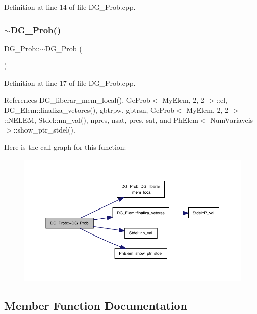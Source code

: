 Definition at line 14 of file D\+G\+\_\+\+Prob.\+cpp.

\mbox{\label{classDG__Prob_ac7d67077fa8154c22a52d63a24db7fba}} 
\subsubsection{\texorpdfstring{$\sim$\+D\+G\+\_\+\+Prob()}{~DG\_Prob()}}
{\footnotesize\ttfamily D\+G\+\_\+\+Prob\+::$\sim$\+D\+G\+\_\+\+Prob (\begin{DoxyParamCaption}{ }\end{DoxyParamCaption})}



Definition at line 17 of file D\+G\+\_\+\+Prob.\+cpp.



References D\+G\+\_\+liberar\+\_\+mem\+\_\+local(), Ge\+Prob$<$ My\+Elem, 2, 2 $>$\+::el, D\+G\+\_\+\+Elem\+::finaliza\+\_\+vetores(), gbtrpw, gbtrsn, Ge\+Prob$<$ My\+Elem, 2, 2 $>$\+::\+N\+E\+L\+EM, Stdel\+::nn\+\_\+val(), npres, nsat, pres, sat, and Ph\+Elem$<$ Num\+Variaveis $>$\+::show\+\_\+ptr\+\_\+stdel().

Here is the call graph for this function\+:
\nopagebreak
\begin{figure}[H]
\begin{center}
\leavevmode
\includegraphics[width=350pt]{classDG__Prob_ac7d67077fa8154c22a52d63a24db7fba_cgraph}
\end{center}
\end{figure}


\subsection{Member Function Documentation}
\mbox{\label{classGeProb_ab622a6354ec337bab6c2563049b0db4f}} 
